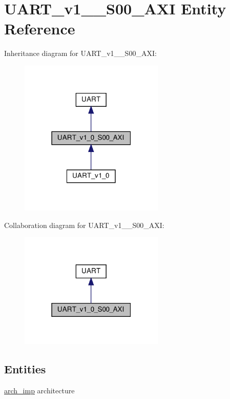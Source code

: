 \hypertarget{classUART__v1__0__S00__AXI}{}\section{U\+A\+R\+T\+\_\+v1\+\_\+\_\+\+S00\+\_\+\+A\+XI Entity Reference}
\label{classUART__v1__0__S00__AXI}


Inheritance diagram for U\+A\+R\+T\+\_\+v1\+\_\+\_\+\+S00\+\_\+\+A\+XI\+:
\nopagebreak
\begin{figure}[H]
\begin{center}
\leavevmode
\includegraphics[width=195pt]{classUART__v1__0__S00__AXI__inherit__graph}
\end{center}
\end{figure}


Collaboration diagram for U\+A\+R\+T\+\_\+v1\+\_\+\_\+\+S00\+\_\+\+A\+XI\+:
\nopagebreak
\begin{figure}[H]
\begin{center}
\leavevmode
\includegraphics[width=195pt]{classUART__v1__0__S00__AXI__coll__graph}
\end{center}
\end{figure}
\subsection*{Entities}
\begin{DoxyCompactItemize}
\item 
\hyperlink{classUART__v1__0__S00__AXI_1_1arch__imp}{arch\+\_\+imp} architecture
\end{DoxyCompactItemize}
